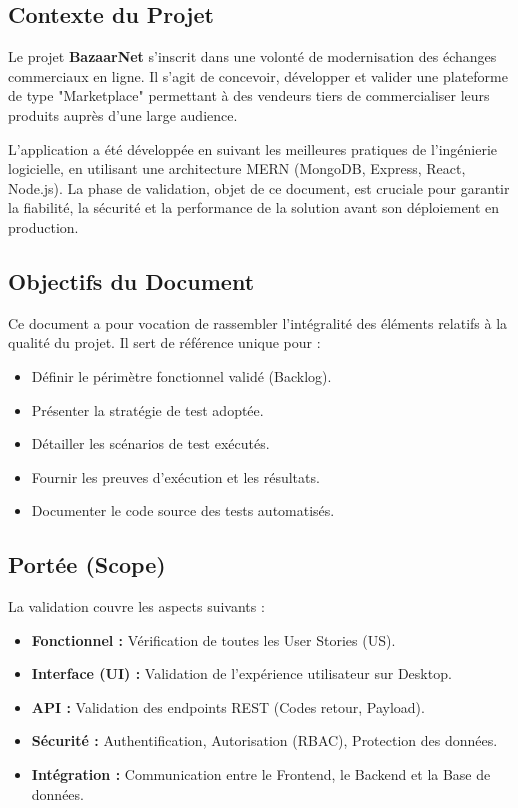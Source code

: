 \documentclass[12pt,a4paper]{article}
\begin{document}
\subsection{Contexte du Projet}
Le projet \textbf{BazaarNet} s'inscrit dans une volonté de modernisation des échanges commerciaux en ligne. Il s'agit de concevoir, développer et valider une plateforme de type "Marketplace" permettant à des vendeurs tiers de commercialiser leurs produits auprès d'une large audience.

L'application a été développée en suivant les meilleures pratiques de l'ingénierie logicielle, en utilisant une architecture MERN (MongoDB, Express, React, Node.js). La phase de validation, objet de ce document, est cruciale pour garantir la fiabilité, la sécurité et la performance de la solution avant son déploiement en production.

\subsection{Objectifs du Document}
Ce document a pour vocation de rassembler l'intégralité des éléments relatifs à la qualité du projet. Il sert de référence unique pour :
\begin{itemize}
    \item Définir le périmètre fonctionnel validé (Backlog).
    \item Présenter la stratégie de test adoptée.
    \item Détailler les scénarios de test exécutés.
    \item Fournir les preuves d'exécution et les résultats.
    \item Documenter le code source des tests automatisés.
\end{itemize}

\subsection{Portée (Scope)}
La validation couvre les aspects suivants :
\begin{itemize}
    \item \textbf{Fonctionnel :} Vérification de toutes les User Stories (US).
    \item \textbf{Interface (UI) :} Validation de l'expérience utilisateur sur Desktop.
    \item \textbf{API :} Validation des endpoints REST (Codes retour, Payload).
    \item \textbf{Sécurité :} Authentification, Autorisation (RBAC), Protection des données.
    \item \textbf{Intégration :} Communication entre le Frontend, le Backend et la Base de données.
\end{itemize}
\end{document}
